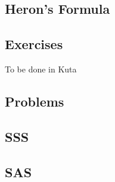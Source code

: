 \subsection{Heron's Formula}
\newpage
\subsection{Exercises}
To be done in Kuta


{}
\subsection{Problems}
\noindent{}
\newpage
\subsection{SSS}
\subsection{SAS}
\newpage
